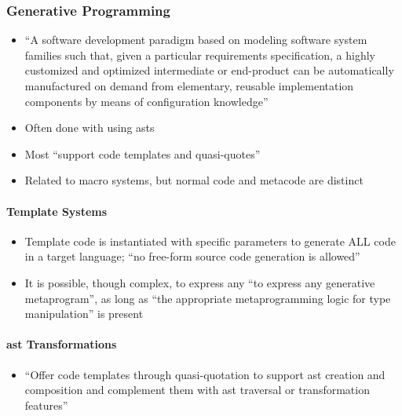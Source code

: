 \subsubsection{Generative Programming \cite[p.~113:13-17]{lilis_survey_2019}}
\begin{itemize}
      \item ``A software development paradigm based on modeling software system
            families such that, given a particular requirements specification,
            a highly customized and optimized intermediate or end-product can
            be automatically manufactured on demand from elementary, reusable
            implementation components by means of configuration knowledge''
      \item Often done with using \acsp{ast} \cite[p.~113:31]{lilis_survey_2019}
      \item Most ``support code templates and quasi-quotes''
            \cite[p.~113:31]{lilis_survey_2019}
      \item Related to macro systems, but normal code and metacode are distinct
\end{itemize}

\paragraph{Template Systems \cite[p.~113:13-14]{lilis_survey_2019}}
\begin{itemize}
      \item Template code is instantiated with specific parameters to generate
            ALL code in a target language; ``no free-form source code generation
            is allowed'' \cite[p.~113:13]{lilis_survey_2019}
      \item It is possible, though complex, to express any ``to express any
            generative metaprogram'', as long as ``the appropriate
            metaprogramming logic for type manipulation'' is present
            \cite[p.~113:14]{lilis_survey_2019}
\end{itemize}

\paragraph{\acs{ast} Transformations \cite[p.~113:14-15]{lilis_survey_2019}}
\begin{itemize}
      \item ``Offer code templates through quasi-quotation to support \acs{ast}
            creation and composition and complement them with \acs{ast}
            traversal or transformation features'' \cite[p.~113:14]{lilis_survey_2019}
\end{itemize}

